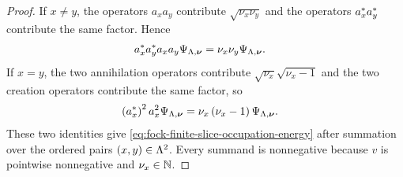 \documentclass[11pt,a4paper]{article}
\theoremstyle{plain}
\theoremstyle{definition}
\theoremstyle{remark}
\begin{document}
\begin{proof}
If $x\neq y$, the operators $a_xa_y$ contribute
$\sqrt{\nu_x\nu_y}$ and the operators $a_x^{\ast}a_y^{\ast}$ contribute the same factor.  Hence
$$\begin{aligned}
a_x^{\ast}a_y^{\ast}a_xa_y\Psi_{\Lambda,\boldsymbol{\nu}}
& =
\nu_x\nu_y\Psi_{\Lambda,\boldsymbol{\nu}}.
\end{aligned}$$
If $x=y$, the two annihilation operators contribute $\sqrt{\nu_x}\sqrt{\nu_x-1}$ and the two creation
operators contribute the same factor, so
$$\begin{aligned}
\left( a_x^{\ast} \right)^2a_x^2\Psi_{\Lambda,\boldsymbol{\nu}}
& =
\nu_x\left( \nu_x-1 \right)\Psi_{\Lambda,\boldsymbol{\nu}}.
\end{aligned}$$
These two identities give \eqref{eq:fock-finite-slice-occupation-energy} after summation over the ordered pairs
$\left( x,y \right)\in\Lambda^2$.  Every summand is nonnegative because $v$ is pointwise nonnegative and
$\nu_x\in\mathbb{N}$.
\end{proof}
\end{document}
